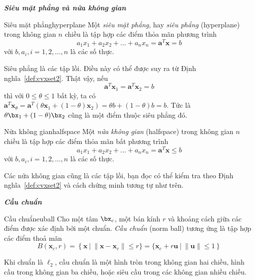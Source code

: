 \textit{\textbf{{Siêu mặt phẳng} và {nửa không gian}}}
\begin{mydef}{Siêu mặt phẳng}{hyperplane}
Một \textit{siêu mặt phẳng}, hay \textit{siêu phẳng} ({hyperplane}) trong
không gian $n$ chiều là tập hợp các điểm thỏa mãn phương trình
\begin{equation} 
a_1 x_1 + a_2 x_2 + \dots + a_n x_n = \mathbf{a}^T\mathbf{x} = b 
\end{equation} 
với $b, a_i, i = 1, 2, \dots, n$ là các số thực. 
\end{mydef}
 
Siêu phẳng là các {tập lồi}. Điều này có thể được suy ra từ Định
nghĩa~\ref{def:cvxset2}. Thật vậy, nếu
\begin{equation*} 
\mathbf{a}^T\mathbf{x}_1 = \mathbf{a}^T\mathbf{x}_2 = b 
\end{equation*} 
thì với $0 \leq \theta \leq 1$ bất kỳ, ta có 
\begin{math} 
\mathbf{a}^T\mathbf{x}_{\theta} = \mathbf{a}^T(\theta \mathbf{x}_1 + (1 - \theta)\mathbf{x}_2) = \theta b + (1 - \theta) b  = b. 
\end{math} 
Tức là $\theta \bx_1 + (1 - \theta)\bx_2$ cũng là một điểm thuộc siêu phẳng đó. 
\begin{mydef}{Nửa không gian}{halfspace}
    Một \textit{nửa không gian} ({halfspace}) trong không gian $n$ chiều là
    tập hợp các điểm thỏa mãn bất phương trình
    \begin{equation*} 
    a_1 x_1 + a_2 x_2 + \dots + a_n x_n = \mathbf{a}^T\mathbf{x} \leq b 
    \end{equation*} 
    với $b, a_i, i = 1, 2, \dots, n$ là các số thực. 
\end{mydef}
 
Các nửa không gian cũng là các tập lồi, bạn đọc có thể kiểm tra theo Định
nghĩa~\ref{def:cvxset2} và cách chứng minh tương tự như trên. 
 
\textit{\textbf{Cầu chuẩn}}
\begin{mydef}{Cầu chuẩn}{euball}
    Cho một tâm $\bx_c$, một bán kính $r$ và khoảng cách giữa các điểm được
    xác định bởi một chuẩn. \textit{Cầu chuẩn} (norm ball) tương ứng là tập hợp các điểm thoả
    mãn 
    \begin{equation*}
    B(\mathbf{x}_c, r) = \left\{\mathbf{x} ~\big|~ \|\mathbf{x} - \mathbf{x}_c\| \leq r \} = \{\mathbf{x}_c + r\mathbf{u} ~\big|~ \|\mathbf{u}\| \leq 1\right\} 
    \end{equation*} 
\end{mydef}
Khi chuẩn là $\ell_2$, cầu chuẩn là một hình tròn trong không gian hai chiều,
hình cầu trong không gian ba chiều, hoặc siêu cầu trong các không gian nhiều
chiều. %

